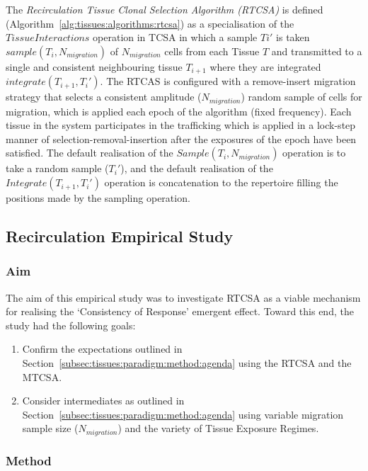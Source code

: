 The \emph{Recirculation Tissue Clonal Selection Algorithm (RTCSA)} is defined (Algorithm~\ref{alg:tissues:algorithms:rtcsa}) as a specialisation of the $TissueInteractions$ operation in TCSA in which a sample $T{i}\prime$ is taken $sample(T_i, N_{migration})$ of $N_{migration}$ cells from each Tissue $T$ and transmitted to a single and consistent neighbouring tissue $T_{i+1}$ where they are integrated $integrate(T_{i+1}, T_{i}\prime)$. The RTCAS is configured with a remove-insert migration strategy that selects a consistent amplitude ($N_{migration}$) random sample of cells for migration, which is applied each epoch of the algorithm (fixed frequency). Each tissue in the system participates in the trafficking which is applied in a lock-step manner of selection-removal-insertion after the exposures of the epoch have been satisfied. The default realisation of the $Sample(T_i, N_{migration})$ operation is to take a random sample ($T_{i}\prime$), and the default realisation of the $Integrate(T_{i+1}, T_{i}\prime)$ operation is concatenation to the repertoire filling the positions made by the sampling operation.

%
%
\subsection{Recirculation Empirical Study}
\label{subsec:tissues:recirculation:study}

%
%
\subsubsection{Aim}
The aim of this empirical study was to investigate RTCSA as a viable mechanism for realising the `Consistency of Response' emergent effect. Toward this end, the study had the following goals:

\begin{enumerate}
	\item Confirm the expectations outlined in Section~\ref{subsec:tissues:paradigm:method:agenda} using the RTCSA and the MTCSA.
	\item Consider intermediates as outlined in Section~\ref{subsec:tissues:paradigm:method:agenda} using variable migration sample size ($N_{migration}$) and the variety of Tissue Exposure Regimes.
\end{enumerate}


%
%
\subsubsection{Method}
%
%
